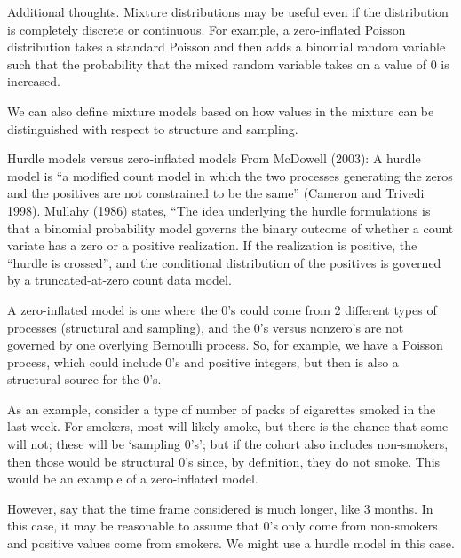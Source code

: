 \documentclass[
  9pt,
  ignorenonframetext,
]{beamer}
\begin{document}
\begin{frame}{Additional thoughts.}
\protect\hypertarget{additional-thoughts.}{}
Mixture distributions may be useful even if the distribution is
completely discrete or continuous. For example, a zero-inflated Poisson
distribution takes a standard Poisson and then adds a binomial random
variable such that the probability that the mixed random variable takes
on a value of 0 is increased.

We can also define mixture models based on how values in the mixture can
be distinguished with respect to structure and sampling.
\end{frame}

\begin{frame}{Hurdle models versus zero-inflated models}
\protect\hypertarget{hurdle-models-versus-zero-inflated-models}{}
From McDowell (2003): A hurdle model is ``a modified count model in
which the two processes generating the zeros and the positives are not
constrained to be the same'' (Cameron and Trivedi 1998). Mullahy (1986)
states, ``The idea underlying the hurdle formulations is that a binomial
probability model governs the binary outcome of whether a count variate
has a zero or a positive realization. If the realization is positive,
the ``hurdle is crossed'', and the conditional distribution of the
positives is governed by a truncated-at-zero count data model.

A zero-inflated model is one where the 0's could come from 2 different
types of processes (structural and sampling), and the 0's versus
nonzero's are not governed by one overlying Bernoulli process. So, for
example, we have a Poisson process, which could include 0's and positive
integers, but then is also a structural source for the 0's.
\end{frame}

\begin{frame}{}
\protect\hypertarget{section-15}{}
As an example, consider a type of number of packs of cigarettes smoked
in the last week. For smokers, most will likely smoke, but there is the
chance that some will not; these will be `sampling 0's'; but if the
cohort also includes non-smokers, then those would be structural 0's
since, by definition, they do not smoke. This would be an example of a
zero-inflated model.

However, say that the time frame considered is much longer, like 3
months. In this case, it may be reasonable to assume that 0's only come
from non-smokers and positive values come from smokers. We might use a
hurdle model in this case.
\end{frame}
\end{document}
